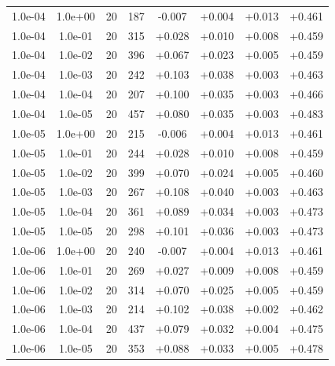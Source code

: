 \documentclass[11pt,a4paper]{article}
\begin{document}
\begin{table}
{\begin{tabular}{*{8}c}
 1.0e-04 	 & 1.0e+00 	 & 20 & 187 	 & -0.007 & +0.004 & +0.013 & +0.461 \\ 
 1.0e-04 	 & 1.0e-01 	 & 20 & 315 	 & +0.028 & +0.010 & +0.008 & +0.459 \\ 
 1.0e-04 	 & 1.0e-02 	 & 20 & 396 	 & +0.067 & +0.023 & +0.005 & +0.459 \\ 
 1.0e-04 	 & 1.0e-03 	 & 20 & 242 	 & +0.103 & +0.038 & +0.003 & +0.463 \\ 
 1.0e-04 	 & 1.0e-04 	 & 20 & 207 	 & +0.100 & +0.035 & +0.003 & +0.466 \\ 
 1.0e-04 	 & 1.0e-05 	 & 20 & 457 	 & +0.080 & +0.035 & +0.003 & +0.483 \\ 
 1.0e-05 	 & 1.0e+00 	 & 20 & 215 	 & -0.006 & +0.004 & +0.013 & +0.461 \\ 
 1.0e-05 	 & 1.0e-01 	 & 20 & 244 	 & +0.028 & +0.010 & +0.008 & +0.459 \\ 
 1.0e-05 	 & 1.0e-02 	 & 20 & 399 	 & +0.070 & +0.024 & +0.005 & +0.460 \\ 
 1.0e-05 	 & 1.0e-03 	 & 20 & 267 	 & +0.108 & +0.040 & +0.003 & +0.463 \\ 
 1.0e-05 	 & 1.0e-04 	 & 20 & 361 	 & +0.089 & +0.034 & +0.003 & +0.473 \\ 
 1.0e-05 	 & 1.0e-05 	 & 20 & 298 	 & +0.101 & +0.036 & +0.003 & +0.473 \\ 
 1.0e-06 	 & 1.0e+00 	 & 20 & 240 	 & -0.007 & +0.004 & +0.013 & +0.461 \\ 
 1.0e-06 	 & 1.0e-01 	 & 20 & 269 	 & +0.027 & +0.009 & +0.008 & +0.459 \\ 
 1.0e-06 	 & 1.0e-02 	 & 20 & 314 	 & +0.070 & +0.025 & +0.005 & +0.459 \\ 
 1.0e-06 	 & 1.0e-03 	 & 20 & 214 	 & +0.102 & +0.038 & +0.002 & +0.462 \\ 
 1.0e-06 	 & 1.0e-04 	 & 20 & 437 	 & +0.079 & +0.032 & +0.004 & +0.475 \\ 
 1.0e-06 	 & 1.0e-05 	 & 20 & 353 	 & +0.088 & +0.033 & +0.005 & +0.478 \\ 
\end{tabular}}
\label{Tab::1}
\end{table} 
\end{document}
